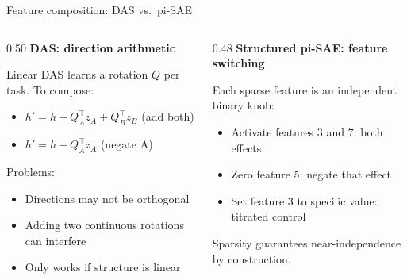 \documentclass[aspectratio=169,11pt]{beamer}
\begin{document}
\begin{frame}{Feature composition: DAS vs.\ pi-SAE}

\begin{columns}[T]
\begin{column}{0.50\textwidth}
\textbf{DAS: direction arithmetic}

\vspace{0.3em}
{\small Linear DAS learns a rotation $Q$ per task. To compose:}
\begin{itemize}
  \item {\small $h' = h + Q_A^\top z_A + Q_B^\top z_B$ (add both)}
  \item {\small $h' = h - Q_A^\top z_A$ (negate A)}
\end{itemize}

\vspace{0.3em}
{\small Problems:}
\begin{itemize}
  \item {\small Directions may not be orthogonal}
  \item {\small Adding two continuous rotations can interfere}
  \item {\small Only works if structure is linear}
\end{itemize}
\end{column}
\begin{column}{0.48\textwidth}
\textbf{Structured pi-SAE: feature switching}

\vspace{0.3em}
{\small Each sparse feature is an independent binary knob:}
\begin{itemize}
  \item {\small Activate features 3 and 7: both effects}
  \item {\small Zero feature 5: negate that effect}
  \item {\small Set feature 3 to specific value: titrated control}
\end{itemize}

\vspace{0.3em}
{\small Sparsity guarantees near-independence by construction.}
\end{column}
\end{columns}

\vspace{0.5em}
\centering
{}
\end{frame}
\end{document}
